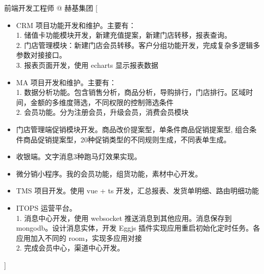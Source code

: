 \documentclass[zh]{resume}
\begin{document}
\begin{experiences}
    {前端开发工程师 @ 赫基集团}%
    [\begin{itemize}
      \item CRM 项目功能开发和维护。主要有：\\ 1. 储值卡功能模块开发，新建充值提案，新建门店转移，报表查询。\\ 2. 门店管理模块：新建门店会员转移。客户分组功能开发，完成复杂多逻辑多参数对接接口。 \\ 3. 报表页面开发，使用 echarts 显示报表数据
      \item MA 项目开发和维护。主要有： \\ 1. 数据分析功能。包含销售分析，商品分析，导购排行，门店排行。区域时间，金额的多维度筛选，不同权限的控制筛选条件 \\ 2. 会员功能。分为注册会员，升级会员，消费会员模块
      \item 门店管理端促销模块开发。商品改价提案型，单条件商品促销提案型, 组合条件商品促销提案型，20种促销类型的不同规则生成，不同表单生成。
      \item 收银端。文字消息3种跑马灯效果实现。
      \item 微分销小程序。我的会员功能，组货功能，素材中心开发。
      \item TMS 项目开发。使用 vue + ts 开发，汇总报表、发货单明细、路由明细功能
      \item ITOPS 运营平台。\\ 1. 消息中心开发，使用 websocket 推送消息到其他应用。消息保存到 mongodb。设计消息实体，开发 Eggjs 插件实现应用重启初始化定时任务。各应用加入不同的 room，实现多应用对接 \\ 2. 完成会员中心，渠道中心开发。
    \end{itemize}]

\end{experiences}
\end{document}
